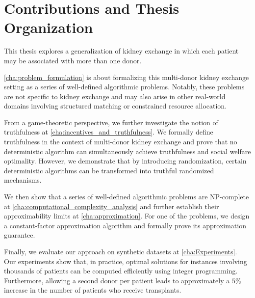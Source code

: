 \section{Contributions and Thesis Organization}

This thesis explores a generalization of kidney exchange in which each patient may be associated with more than one donor.

\autoref{cha:problem_formulation} is about formalizing this multi-donor kidney exchange setting as a series of well-defined algorithmic problems. Notably, these problems are not specific to kidney exchange and may also arise in other real-world domains involving structured matching or constrained resource allocation.

From a game-theoretic perspective, we further investigate the notion of truthfulness at \autoref{cha:incentives_and_truthfulness}.  We formally define truthfulness in the context of multi-donor kidney exchange and prove that no deterministic algorithm can simultaneously achieve truthfulness and social welfare optimality. However, we demonstrate that by introducing randomization, certain deterministic algorithms can be transformed into truthful randomized mechanisms.

We then show that a series of well-defined algorithmic problems are NP-complete at \autoref{cha:computational_complexity_analysis} and further establish their approximability limits at \autoref{cha:approximation}. For one of the problems, we design a constant-factor approximation algorithm and formally prove its approximation guarantee.


Finally, we evaluate our approach on synthetic datasets at \autoref{cha:Experiments}. Our experiments show that, in practice, optimal solutions for instances involving thousands of patients can be computed efficiently using integer programming. Furthermore, allowing a second donor per patient leads to approximately a $5\%$ increase in the number of patients who receive transplants.




